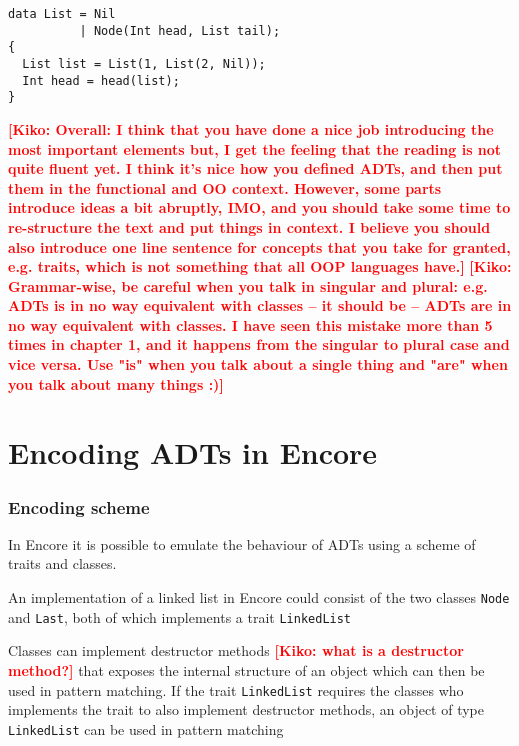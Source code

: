 \documentclass[10pt]{report}
\newcommand{\KIKO}[1]{\textcolor{red}{\textbf{[Kiko: #1]}}}
\begin{document}
\begin{lstlisting}[language=encore,caption={Accessor funtion in ABS, variable head on line 5 is assigned 1}]
data List = Nil
          | Node(Int head, List tail);
{
  List list = List(1, List(2, Nil));
  Int head = head(list);
}
\end{lstlisting}


\KIKO{Overall: I think that you have done a nice job introducing the most important elements but,
  I get the feeling that the reading is not quite fluent yet. I think it's nice how you defined ADTs, and then
  put them in the functional and OO context. However, some parts introduce ideas a bit abruptly, IMO,
  and you should take some time to re-structure the text and put things in context. I believe you should
  also introduce one line sentence for concepts that you take for granted, e.g. traits, which is not something
  that all OOP languages have.}
\KIKO{Grammar-wise, be careful when you talk in singular and plural: e.g. ADTs is in no way equivalent with classes -- it should be -- ADTs are in no way equivalent with classes. I have seen this mistake more than
5 times in chapter 1, and it happens from the singular to plural case and vice versa. Use "is" when you talk about a single thing and "are" when you talk about many things :)}

\chapter{Encoding ADTs in Encore}
\subsection{Encoding scheme}
\par{\noindent In Encore it is possible to emulate the behaviour of ADTs using a scheme of traits and classes.}\cite{gustavL}%
\par{\noindent An implementation of a linked list in Encore could consist of the two classes \texttt{Node} and \texttt{Last}, both of which implements a trait \texttt{LinkedList}\\}
\par{\noindent Classes can implement destructor methods \KIKO{what is a destructor method?} that exposes the internal structure of an object which can then be used in pattern matching. If the trait \texttt{LinkedList} requires the classes who implements the trait to also implement destructor methods, an object of type \texttt{LinkedList} can be used in pattern matching}
\end{document}
